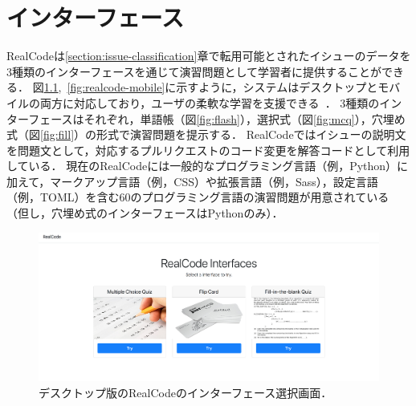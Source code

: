 \def\vector#1{\mbox{\boldmath $#1$}}

\chapter[インターフェース]{インターフェース}
\graphicspath{{Chapters_implementation/Figs/}}



RealCodeは\ref{section:issue-classification}章で転用可能とされたイシューのデータを3種類のインターフェースを通じて演習問題として学習者に提供することができる．
図\ref{fig:interface-selector},~\ref{fig:realcode-mobile}に示すように，システムはデスクトップとモバイルの両方に対応しており，ユーザの柔軟な学習を支援できる~\cite{gassler2004integrated}．
3種類のインターフェースはそれぞれ，単語帳（図\ref{fig:flash}），選択式（図\ref{fig:mcq}），穴埋め式（図\ref{fig:fill}）の形式で演習問題を提示する．
RealCodeではイシューの説明文を問題文として，対応するプルリクエストのコード変更を解答コードとして利用している．
現在のRealCodeには一般的なプログラミング言語（例，Python）に加えて，マークアップ言語（例，CSS）や拡張言語（例，Sass），設定言語（例，TOML）を含む60のプログラミング言語の演習問題が用意されている（但し，穴埋め式のインターフェースはPythonのみ）．

\begin{figure}[H]
	\centering
  \includegraphics[width=1.0\columnwidth]{20181228-realcode-interfaces-select.png}
  \caption{デスクトップ版のRealCodeのインターフェース選択画面．}
  \label{fig:interface-selector}
\end{figure}


